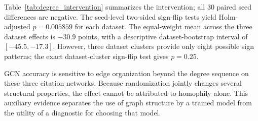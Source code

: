 Table~\ref{tab:degree_intervention} summarizes the intervention; all 30 paired seed differences are negative. The seed-level two-sided sign-flip tests yield Holm-adjusted $p=0.005859$ for each dataset. The equal-weight mean across the three dataset effects is $-30.9$ points, with a descriptive dataset-bootstrap interval of $[-45.5,-17.3]$. However, three dataset clusters provide only eight possible sign patterns; the exact dataset-cluster sign-flip test gives $p=0.25$.

GCN accuracy is sensitive to edge organization beyond the degree sequence on these three citation networks. Because randomization jointly changes several structural properties, the effect cannot be attributed to homophily alone. This auxiliary evidence separates the use of graph structure by a trained model from the utility of a diagnostic for choosing that model.
